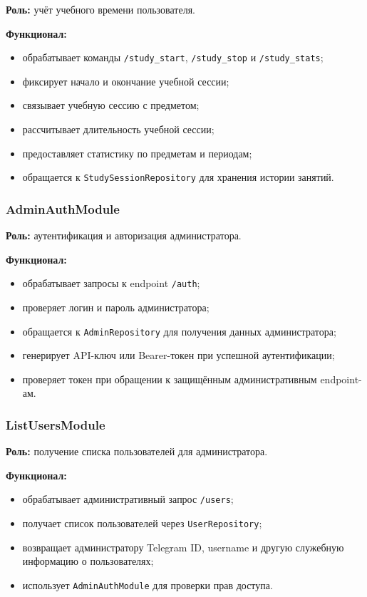 \documentclass[10pt,a4paper,final]{article} %
\begin{document}
\textbf{Роль:} учёт учебного времени пользователя.

\textbf{Функционал:}
\begin{itemize}
    \item обрабатывает команды \texttt{/study\_start}, \texttt{/study\_stop} и
    \texttt{/study\_stats};
    \item фиксирует начало и окончание учебной сессии;
    \item связывает учебную сессию с предметом;
    \item рассчитывает длительность учебной сессии;
    \item предоставляет статистику по предметам и периодам;
    \item обращается к \texttt{StudySessionRepository} для хранения истории
    занятий.
\end{itemize}

\subsubsection{AdminAuthModule}

\textbf{Роль:} аутентификация и авторизация администратора.

\textbf{Функционал:}
\begin{itemize}
    \item обрабатывает запросы к endpoint \texttt{/auth};
    \item проверяет логин и пароль администратора;
    \item обращается к \texttt{AdminRepository} для получения данных
    администратора;
    \item генерирует API-ключ или Bearer-токен при успешной аутентификации;
    \item проверяет токен при обращении к защищённым административным
    endpoint-ам.
\end{itemize}

\subsubsection{ListUsersModule}

\textbf{Роль:} получение списка пользователей для администратора.

\textbf{Функционал:}
\begin{itemize}
    \item обрабатывает административный запрос \texttt{/users};
    \item получает список пользователей через \texttt{UserRepository};
    \item возвращает администратору Telegram ID, username и другую служебную
    информацию о пользователях;
    \item использует \texttt{AdminAuthModule} для проверки прав доступа.
\end{itemize}
\end{document}
